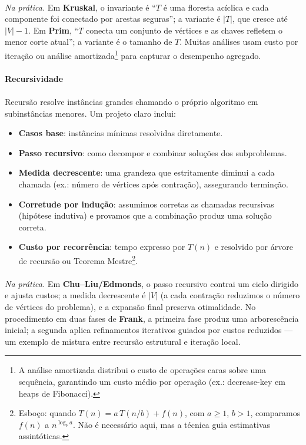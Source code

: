 \documentclass[12pt,a4paper]{article}
\def\texttt#1{#1}%
\def\emph#1{#1}%
\begin{document}
\paragraph{}
	\textit{Na prática.} Em \textbf{Kruskal}, o invariante é “$T$ é uma floresta acíclica e cada componente foi conectado por arestas seguras”; a variante é $|T|$, que cresce até $|V|-1$. Em \textbf{Prim}, “$T$ conecta um conjunto de vértices e as chaves refletem o menor corte atual”; a variante é o tamanho de $T$. Muitas análises usam \emph{custo por iteração} ou \emph{análise amortizada}\footnote{A análise amortizada distribui o custo de operações caras sobre uma sequência, garantindo um custo médio por operação (ex.: \texttt{decrease-key} em heaps de Fibonacci).} para capturar o desempenho agregado.

\paragraph{Recursividade}
\paragraph{}
Recursão resolve instâncias grandes chamando o próprio algoritmo em subinstâncias menores. Um projeto claro inclui:

\begin{itemize}\setlength{\itemsep}{2pt}
    \item \textbf{Casos base}: instâncias mínimas resolvidas diretamente.
    \item \textbf{Passo recursivo}: como decompor e combinar soluções dos subproblemas.
    \item \textbf{Medida decrescente}: uma grandeza que estritamente diminui a cada chamada (ex.: número de vértices após contração), assegurando terminção.
    \item \textbf{Corretude por indução}: assumimos corretas as chamadas recursivas (hipótese indutiva) e provamos que a combinação produz uma solução correta.
    \item \textbf{Custo por recorrência}: tempo expresso por $T(n)$ e resolvido por \emph{árvore de recursão} ou Teorema Mestre\footnote{Esboço: quando $T(n)=a\,T(n/b)+f(n)$, com $a\ge 1$, $b>1$, comparamos $f(n)$ a $n^{\log_b a}$. Não é necessário aqui, mas a técnica guia estimativas assintóticas.}.
\end{itemize}

\paragraph{}
	\textit{Na prática.} Em \textbf{Chu–Liu/Edmonds}, o passo recursivo contrai um ciclo dirigido e ajusta custos; a medida decrescente é $|V|$ (a cada contração reduzimos o número de vértices do problema), e a expansão final preserva otimalidade. No procedimento em duas fases de \textbf{Frank}, a primeira fase produz uma arborescência inicial; a segunda aplica \emph{refinamentos iterativos} guiados por custos reduzidos — um exemplo de mistura entre recursão estrutural e iteração local.
\end{document}
